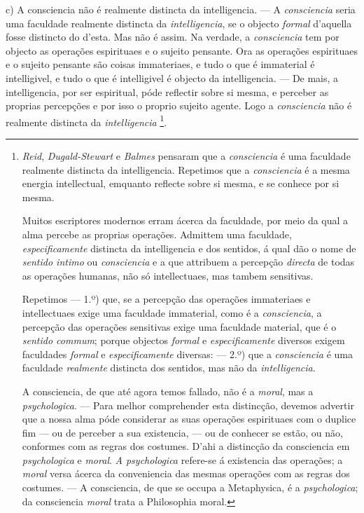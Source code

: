 c) A consciencia não é realmente distincta da intelligencia. --- A \emph{consciencia} seria uma faculdade realmente distincta da \emph{intelligencia}, se o objecto \emph{formal} d'aquella fosse distincto do d'esta. Mas não é assim. Na verdade, a \emph{consciencia} tem por objecto as operações espirituaes e o sujeito pensante. Ora as operações espirituaes e o sujeito pensante são coisas immateriaes, e tudo o que é immaterial é intelligivel, e tudo o que é intelligivel é objecto da intelligencia. --- De mais, a intelligencia, por ser espiritual, póde reflectir sobre si mesma, e perceber as proprias   percepções e por isso o proprio sujeito agente. Logo a \emph{consciencia} não é realmente distincta da \emph{intelligencia} \footnote{\emph{Reid}, \emph{Dugald-Stewart} e \emph{Balmes} pensaram que a \emph{consciencia} é uma faculdade realmente distincta da intelligencia. Repetimos que a \emph{consciencia} é a mesma energia intellectual, emquanto reflecte sobre si mesma, e se conhece por si mesma.\par Muitos escriptores modernos erram ácerca da faculdade, por meio da qual a alma percebe as proprias operações. Admittem uma faculdade, \emph{especificamente} distincta da intelligencia e dos sentidos, á qual dão o nome de \emph{sentido intimo} ou \emph{consciencia} e a que attribuem a percepção \emph{directa} de todas as operações humanas, não só intellectuaes, mas tambem sensitivas.\par Repetimos --- 1.º) que, se a percepção das operações immateriaes e intellectuaes exige uma faculdade immaterial, como é a \emph{consciencia}, a percepção das operações sensitivas exige uma faculdade material, que é o \emph{sentido commum}; porque objectos \emph{formal} e \emph{especificamente} diversos exigem faculdades \emph{formal} e \emph{especificamente} diversas: --- 2.º) que a \emph{consciencia} é uma faculdade \emph{realmente} distincta dos sentidos, mas não da \emph{intelligencia}.\par A consciencia, de que até agora temos fallado, não é a \emph{moral}, mas a \emph{psychologica}. --- Para melhor comprehender esta distincção, devemos advertir que a nossa alma póde considerar as suas operações espirituaes com o duplice fim --- ou de perceber a sua existencia, --- ou de conhecer se estão, ou não, conformes com as regras dos costumes. D'ahi a distincção da consciencia em \emph{psychologica} e \emph{moral}. \emph{A psychologica} refere-se á existencia das operações; a \emph{moral} versa ácerca da conveniencia das mesmas operações com as regras dos costumes. --- A consciencia, de que se occupa a Metaphysica, é a \emph{psychologica}; da consciencia \emph{moral} trata a Philosophia moral.}.

